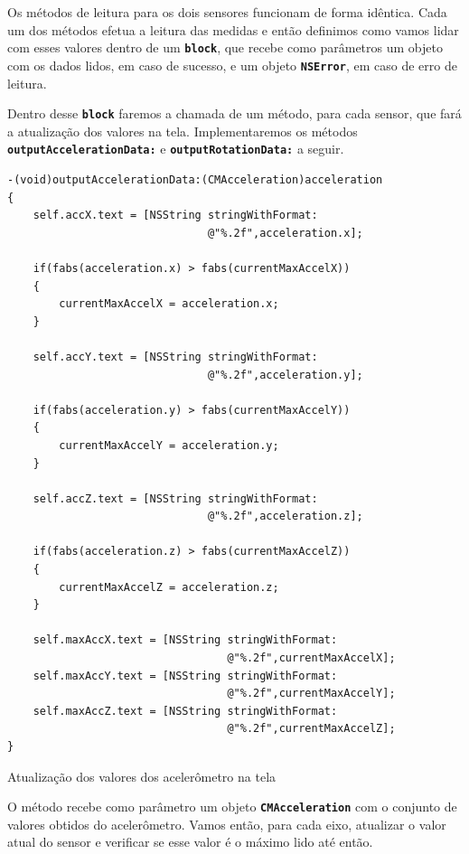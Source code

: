 \documentclass[a4paper,12pt,brazil,oneside]{book}
\begin{document}
Os métodos de leitura para os dois sensores funcionam de forma idêntica. Cada um dos métodos efetua a leitura das medidas e então definimos como vamos lidar com esses valores dentro de um \texttt{\textbf{block}}, que recebe como parâmetros um objeto com os dados lidos, em caso de sucesso, e um objeto \texttt{\textbf{NSError}}, em caso de erro de leitura.

Dentro desse \texttt{\textbf{block}} faremos a chamada de um método, para cada sensor, que fará a atualização dos valores na tela. Implementaremos os métodos \texttt{\textbf{outputAccelerationData:}} e \texttt{\textbf{outputRotationData:}} a seguir.

\begin{listing}[H]
\begin{verbatim}
-(void)outputAccelerationData:(CMAcceleration)acceleration
{
    self.accX.text = [NSString stringWithFormat:
                               @"%.2f",acceleration.x];
    
    if(fabs(acceleration.x) > fabs(currentMaxAccelX))
    {
        currentMaxAccelX = acceleration.x;
    }
    
    self.accY.text = [NSString stringWithFormat:
                               @"%.2f",acceleration.y];
    
    if(fabs(acceleration.y) > fabs(currentMaxAccelY))
    {
        currentMaxAccelY = acceleration.y;
    }
    
    self.accZ.text = [NSString stringWithFormat:
                               @"%.2f",acceleration.z];
    
    if(fabs(acceleration.z) > fabs(currentMaxAccelZ))
    {
        currentMaxAccelZ = acceleration.z;
    }
    
    self.maxAccX.text = [NSString stringWithFormat:
                                  @"%.2f",currentMaxAccelX];
    self.maxAccY.text = [NSString stringWithFormat:
                                  @"%.2f",currentMaxAccelY];
    self.maxAccZ.text = [NSString stringWithFormat:
                                  @"%.2f",currentMaxAccelZ];
}
\end{verbatim}
\caption{Atualização dos valores dos acelerômetro na tela}
\end{listing}


O método recebe como parâmetro um objeto \texttt{\textbf{CMAcceleration}} com o conjunto de valores obtidos do acelerômetro. Vamos então, para cada eixo, atualizar o valor atual do sensor e verificar se esse valor é o máximo lido até então.
\end{document}
